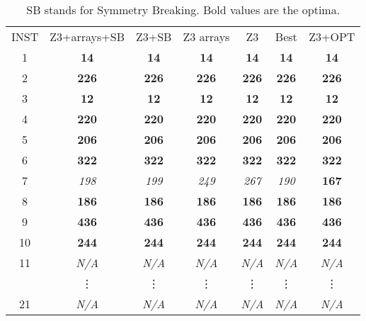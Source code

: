 \begin{table}
    \centering
    \begin{tabular}{|c|cccccc|}
    INST &Z3+arrays+SB&     Z3+SB    &   Z3 arrays  &      Z3      &      Best    &    Z3+OPT    \\
    \cline{1-7}
    1  & \textbf{14}  & \textbf{14}  & \textbf{14}  & \textbf{14}  & \textbf{14}  & \textbf{14}  \\
    2  & \textbf{226} & \textbf{226} & \textbf{226} & \textbf{226} & \textbf{226} & \textbf{226} \\
    3  & \textbf{12}  & \textbf{12}  & \textbf{12}  & \textbf{12}  & \textbf{12}  & \textbf{12}  \\
    4  & \textbf{220} & \textbf{220} & \textbf{220} & \textbf{220} & \textbf{220} & \textbf{220} \\
    5  & \textbf{206} & \textbf{206} & \textbf{206} & \textbf{206} & \textbf{206} & \textbf{206} \\
    6  & \textbf{322} & \textbf{322} & \textbf{322} & \textbf{322} & \textbf{322} & \textbf{322} \\
    7  & \emph{198}   & \emph{199}   & \emph{249}   & \emph{267}   & \emph{190}   & \textbf{167} \\
    8  & \textbf{186} & \textbf{186} & \textbf{186} & \textbf{186} & \textbf{186} & \textbf{186} \\
    9  & \textbf{436} & \textbf{436} & \textbf{436} & \textbf{436} & \textbf{436} & \textbf{436} \\
    10 & \textbf{244} & \textbf{244} & \textbf{244} & \textbf{244} & \textbf{244} & \textbf{244} \\
    11 & \emph{N/A} & \emph{N/A} & \emph{N/A} & \emph{N/A} & \emph{N/A} & \emph{N/A} \\
     & \vdots & \vdots & \vdots & \vdots & \vdots & \vdots \\
    21 & \emph{N/A} & \emph{N/A} & \emph{N/A} & \emph{N/A} & \emph{N/A} & \emph{N/A} \\
    \end{tabular}
\caption{SB stands for Symmetry Breaking. Bold values are the optima.}
\label{tab}
\end{table}